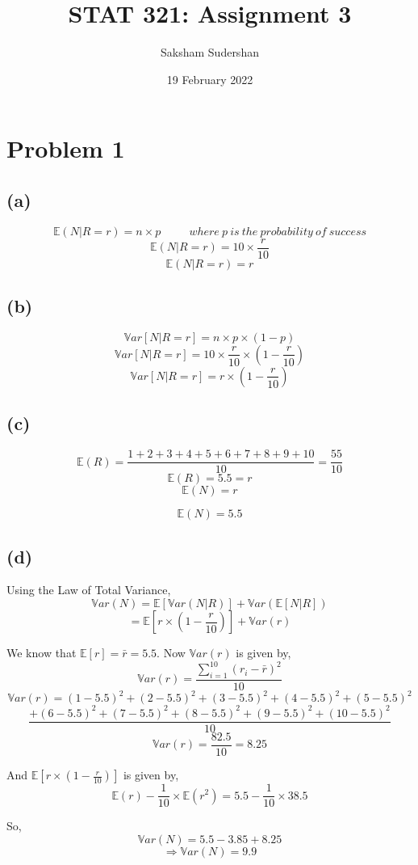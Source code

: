 \documentclass{article}
\title{ STAT 321: Assignment 3}
\author{Saksham Sudershan}
\date{19 February 2022}
\begin{document}
	\maketitle
	\section*{Problem 1}
		\subsection*{(a)}
			$$ \mathbb{E}(N|R=r) = n \times p \; \; \; \; \; \; \; \; \; where\ p\ is\ the\ probability\ of\ success $$
			$$ \mathbb{E}(N|R=r) = 10 \times \frac{r}{10}  $$
			$$ \mathbb{E}(N|R=r) = r $$
		\subsection*{(b)}
			$$ \mathbb{V}ar[N|R=r] =  n \times p \times (1-p) $$
			$$ \mathbb{V}ar[N|R=r] = 10 \times \frac{r}{10} \times \left(1-\frac{r}{10}\right)  $$
			$$ \mathbb{V}ar[N|R=r] = r \times \left(1-\frac{r}{10}\right)  $$
		\subsection*{(c)}
			$$ \mathbb{E}(R) = \frac{1+2+3+4+5+6+7+8+9+10}{10}=\frac{55}{10} $$
			$$ \mathbb{E}(R) = 5.5 = r $$
			$$ \mathbb{E}(N) = r $$

			$$ \mathbb{E}(N) = 5.5 $$
		\subsection*{(d)}
			Using the Law of Total Variance,
			$$ \mathbb{V}ar(N) = \mathbb{E}\left[\mathbb{V}ar(N|R)\right] + \mathbb{V}ar\left(\mathbb{E}[N|R]\right) $$
			$$ = \mathbb{E}\left[ r \times \left(1-\frac{r}{10}\right) \right] + \mathbb{V}ar(r)$$

			We know that $\mathbb{E}[r] = \bar r =  5.5$. Now $\mathbb{V}ar(r)$ is given by,
			$$ \mathbb{V}ar(r) = \frac{\sum_{i=1}^{10}(r_i - \bar{r})^2}{10} $$
			$$ \mathbb{V}ar(r) = (1-5.5)^2 + (2-5.5)^2 +(3-5.5)^2+(4-5.5)^2+(5-5.5)^2 $$
			$$ \frac{+(6-5.5)^2+(7-5.5)^2+(8-5.5)^2+(9-5.5)^2+(10-5.5)^2}{10} $$
			$$ \mathbb{V}ar(r) = \frac{82.5}{10} = 8.25 $$
			
			And $ \mathbb{E}\left[ r \times \left(1-\frac{r}{10}\right) \right]$ is given by,
			$$ \mathbb{E}(r) - \frac{1}{10} \times \mathbb{E}(r^2) = 5.5 - \frac{1}{10} \times 38.5 $$

			So,
			$$ \mathbb{V}ar(N) =5.5-3.85 + 8.25 $$
			$$ \Rightarrow \mathbb{V}ar(N) = 9.9 $$
	
\end{document}
